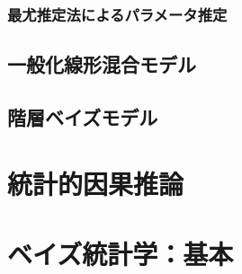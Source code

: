 \subsection{最尤推定法によるパラメータ推定}

\section{一般化線形混合モデル}
\section{階層ベイズモデル}


\chapter{統計的因果推論}


\chapter{ベイズ統計学：基本}